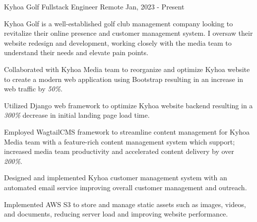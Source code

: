 \cventry
{Kyhoa Golf} %
{Fullstack Engineer} %
{Remote}
{Jan, 2023 - Present} %
{
	Kyhoa Golf is a well-established golf club management company looking to revitalize their online presence and customer management system.
	I oversaw their website redesign and development, working closely with the media team to understand their needs and elevate pain points.
	\begin{cvitemsdesc}
		\item {Collaborated with Kyhoa Media team to reorganize and optimize Kyhoa website to create a modern web application using Bootstrap resulting in an increase in web traffic by \emph{50\%}.}
		\item {Utilized Django web framework to optimize Kyhoa website backend resulting in a \emph{300\%} decrease in initial landing page load time.}
		\item {Employed WagtailCMS framework to streamline content management for Kyhoa Media team with a feature-rich content management system which support; increased media team productivity and accelerated content delivery by over \emph{200\%}.}
		\item {Designed and implemented Kyhoa customer management system with an automated email service improving overall customer management and outreach.}
		\item {Implemented AWS S3 to store and manage static assets such as images, videos, and documents, reducing server load and improving website performance.}
	\end{cvitemsdesc}
}
